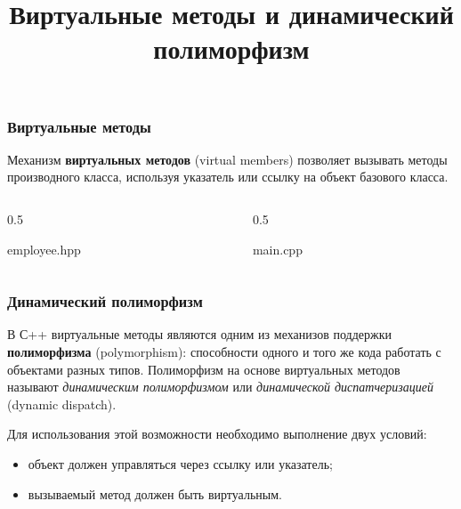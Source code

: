\documentclass[compress, 8pt, aspectratio=169]{beamer}
\title{Виртуальные методы и динамический полиморфизм}
\begin{document}
\frame[plain]{\titlepage}

\begin{frame}[fragile]

    \frametitle{Виртуальные методы}

    \hfill\break
    Механизм \textbf{виртуальных методов} (virtual members) позволяет вызывать
    методы производного класса, используя указатель или ссылку на объект
    базового класса.

    \begin{columns}

        \begin{column}{0.5\textwidth}

                {employee.hpp}

        \end{column}

        \begin{column}{0.5\textwidth}

                {main.cpp}

        \end{column}

    \end{columns}

\end{frame}

\begin{frame}[fragile]

    \frametitle{Динамический полиморфизм}

    В С++ виртуальные методы являются одним из механизов поддержки
    \textbf{полиморфизма} (polymorphism): способности одного и того же
    кода работать с объектами разных типов.
    Полиморфизм на основе виртуальных методов называют \textit{динамическим
    полиморфизмом} или \textit{динамической диспатчеризацией} (dynamic dispatch).

    \hfill\break
    Для использования этой возможности необходимо выполнение двух условий:

    \begin{itemize}
        \item объект должен управляться через ссылку или указатель;
        \item вызываемый метод должен быть виртуальным.
    \end{itemize}

\end{frame}
\end{document}

